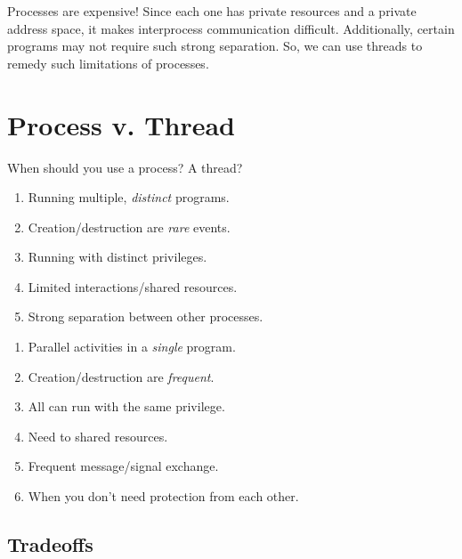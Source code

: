 \documentclass{report}
\newcommand{\corollaryBegin}[1]{\begin{tcolorbox}[colback=teal!5!white,colframe=black!75!teal,title={Corollary:
      #1}]}
\newcommand{\corollaryEnd}{\end{tcolorbox}}
\begin{document}
\corollaryBegin{Why Not Processes?}
Processes are expensive! Since each one has private resources and a private address space, it makes
interprocess communication difficult. Additionally, certain programs may not require such strong
separation. So, we can use threads to remedy such limitations of processes.
\corollaryEnd





\section{Process v. Thread}
When should you use a process? A thread?

\begin{tcbraster}[raster columns=2, raster equal height, raster force size=false]
  \begin{tcolorbox}[colback=teal!5!white,colframe=black!75!teal,title=Processes]
    \begin{enumerate}[label=\textit{(\roman*)}]
    \item Running multiple, \textit{distinct} programs.
    \item Creation/destruction are \textit{rare} events.
    \item Running with distinct privileges.
    \item Limited interactions/shared resources.
    \item Strong separation between other processes.
    \end{enumerate}
  \end{tcolorbox}
  \begin{tcolorbox}[colback=yellow!5!white,colframe=black!75!yellow,title=Threads]
    \begin{enumerate}[label=\textit{(\roman*)}]
    \item Parallel activities in a \textit{single} program.
    \item Creation/destruction are \textit{frequent}.
    \item All can run with the same privilege.
    \item Need to shared resources.
    \item Frequent message/signal exchange.
    \item When you don't need protection from each other.
    \end{enumerate}
  \end{tcolorbox}
\end{tcbraster}


\subsection{Tradeoffs}
\end{document}

